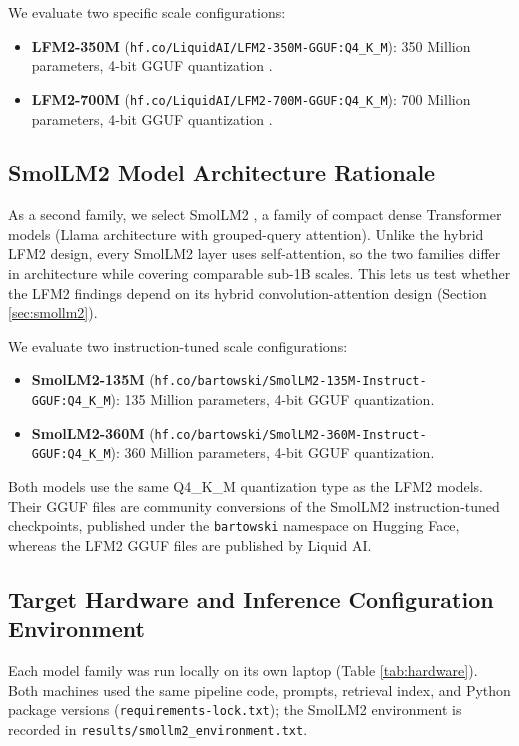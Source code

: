 \documentclass[10pt]{article}
\begin{document}
We evaluate two specific scale configurations:
\begin{itemize}
    \item \textbf{LFM2-350M} (\texttt{hf.co/LiquidAI/LFM2-350M-GGUF:Q4\_K\_M}): 350 Million parameters, 4-bit GGUF quantization \citep{liquid2024lfm}.
    \item \textbf{LFM2-700M} (\texttt{hf.co/LiquidAI/LFM2-700M-GGUF:Q4\_K\_M}): 700 Million parameters, 4-bit GGUF quantization \citep{liquid2024lfm}.
\end{itemize}

\subsection{SmolLM2 Model Architecture Rationale}
As a second family, we select SmolLM2 \citep{allal2025smollm2}, a family of compact dense Transformer models (Llama architecture with grouped-query attention). Unlike the hybrid LFM2 design, every SmolLM2 layer uses self-attention, so the two families differ in architecture while covering comparable sub-1B scales. This lets us test whether the LFM2 findings depend on its hybrid convolution-attention design (Section \ref{sec:smollm2}).

We evaluate two instruction-tuned scale configurations:
\begin{itemize}
    \item \textbf{SmolLM2-135M} (\texttt{hf.co/bartowski/SmolLM2-135M-Instruct-GGUF:Q4\_K\_M}): 135 Million parameters, 4-bit GGUF quantization.
    \item \textbf{SmolLM2-360M} (\texttt{hf.co/bartowski/SmolLM2-360M-Instruct-GGUF:Q4\_K\_M}): 360 Million parameters, 4-bit GGUF quantization.
\end{itemize}
Both models use the same Q4\_K\_M quantization type as the LFM2 models. Their GGUF files are community conversions of the SmolLM2 instruction-tuned checkpoints, published under the \texttt{bartowski} namespace on Hugging Face, whereas the LFM2 GGUF files are published by Liquid AI.

\subsection{Target Hardware and Inference Configuration Environment}
Each model family was run locally on its own laptop (Table \ref{tab:hardware}). Both machines used the same pipeline code, prompts, retrieval index, and Python package versions (\texttt{requirements-lock.txt}); the SmolLM2 environment is recorded in \texttt{results/smollm2\_environment.txt}.
\end{document}
